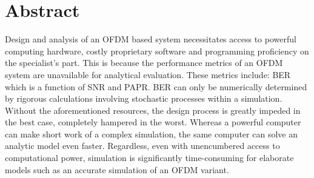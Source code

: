 \chapter*{Abstract}

Design and analysis of an \gls{OFDM} based system necessitates access to powerful computing hardware, costly proprietary software and programming proficiency on the specialist's part. This is because the performance metrics of an \gls{OFDM} system are unavailable for analytical evaluation. These metrics include: \gls{BER} which is a function of \gls{SNR} and \gls{PAPR}. \gls{BER} can only be numerically determined by rigorous calculations involving stochastic processes within a simulation. Without the aforementioned resources, the design process is greatly impeded in the best case, completely hampered in the worst. Whereas a powerful computer can make short work of a complex simulation, the same computer can solve an analytic model even faster. Regardless, even with unencumbered access to computational power, simulation is significantly time-consuming for elaborate models such as an accurate simulation of an \gls{OFDM} variant.
 

